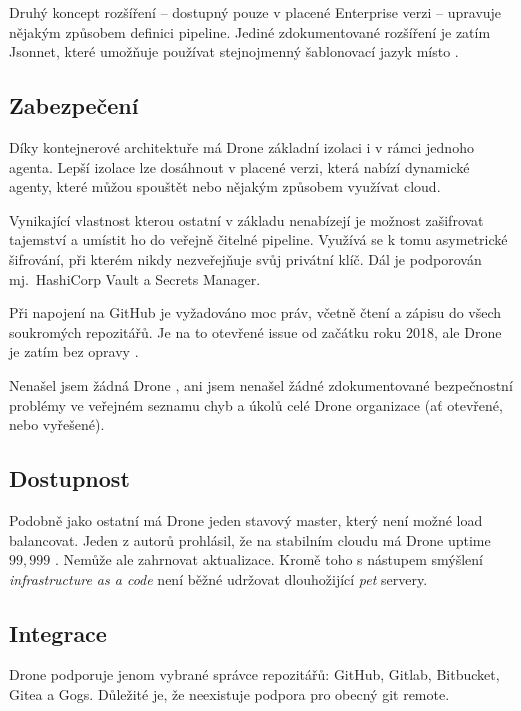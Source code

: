         Druhý koncept rozšíření -- dostupný pouze v placené Enterprise verzi -- upravuje nějakým způsobem definici pipeline. Jediné zdokumentované rozšíření je zatím Jsonnet, které umožňuje používat stejnojmenný šablonovací jazyk místo  \cite{drone-jsonnet}.

    \subsection{Zabezpečení}
        Díky kontejnerové architektuře má Drone základní izolaci i v rámci jednoho agenta. Lepší izolace lze dosáhnout v placené verzi, která nabízí dynamické agenty, které můžou spouštět  nebo nějakým způsobem využívat cloud.

        Vynikající vlastnost kterou ostatní v základu \CI nenabízejí je možnost zašifrovat tajemství a umístit ho do veřejně čitelné pipeline. Využívá se k tomu asymetrické šifrování, při kterém \CI nikdy nezveřejňuje svůj privátní klíč. Dál je podporován mj.~HashiCorp Vault a  Secrets Manager.

        Při napojení na GitHub je vyžadováno moc práv, včetně čtení a zápisu do všech soukromých repozitářů. Je na to otevřené issue od začátku roku 2018, ale Drone je zatím bez opravy \cite{drone-github-acl}.

        Nenašel jsem žádná Drone , ani jsem nenašel žádné zdokumentované bezpečnostní problémy ve veřejném seznamu chyb a úkolů celé Drone organizace (ať otevřené, nebo vyřešené).

    \subsection{Dostupnost}
        Podobně jako ostatní \CI má Drone jeden stavový master, který není možné load balancovat. Jeden z autorů prohlásil, že na stabilním cloudu má Drone uptime $99,999$ \cite{drone-ha}. Nemůže ale zahrnovat aktualizace. Kromě toho s nástupem smýšlení \textit{infrastructure as a code} není běžné udržovat dlouhožijící \textit{pet} servery.

        \blind[1]
        \blind[1]

    \subsection{Integrace}
        Drone podporuje jenom vybrané správce repozitářů: GitHub, Gitlab, Bitbucket, Gitea a Gogs. Důležité je, že neexistuje podpora pro obecný git remote.


